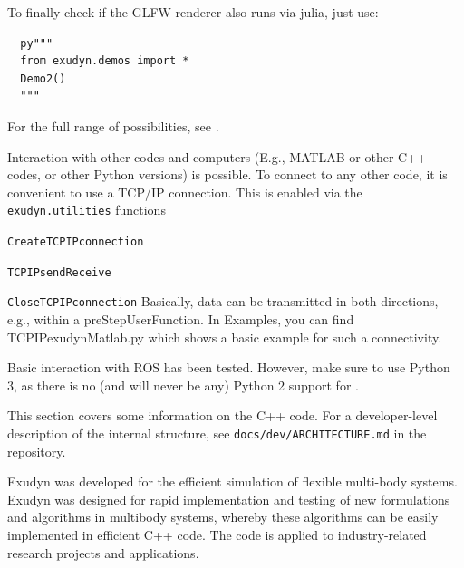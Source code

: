 To finally check if the GLFW renderer also runs via julia, just use:
\begin{lstlisting}
  py"""
  from exudyn.demos import *
  Demo2()
  """
\end{lstlisting}
For the full range of possibilities, see .


%
Interaction with other codes and computers (E.g., MATLAB or other C++ codes, or other Python versions)
is possible. 
To connect to any other code, it is convenient to use a TCP/IP connection. This is enabled via 
the \texttt{exudyn.utilities} functions
\bi
\item \texttt{CreateTCPIPconnection}
\item \texttt{TCPIPsendReceive}
\item \texttt{CloseTCPIPconnection}
\ei
Basically, data can be transmitted in both directions, e.g., within a preStepUserFunction. In Examples, you can find 
 TCPIPexudynMatlab.py which shows a basic example for such a connectivity.

%
Basic interaction with ROS has been tested. However, make sure to use Python 3, as there is no (and will never be any) Python 2
support for \codeName.






This section covers some information on the C++ code. For a developer-level description of the internal structure, see \texttt{docs/dev/ARCHITECTURE.md} in the repository.

Exudyn was developed for the efficient simulation of flexible multi-body systems. Exudyn was designed for rapid implementation and testing of new formulations and algorithms in multibody systems, whereby these algorithms can be easily implemented in efficient C++ code. The code is applied to industry-related research projects and applications.

